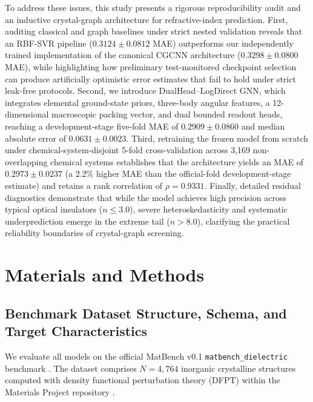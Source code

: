 \documentclass[journal,article,submit,moreauthors,pdftex]{article}
\begin{document}
To address these issues, this study presents a rigorous reproducibility audit and an inductive crystal-graph architecture for refractive-index prediction. First, auditing classical and graph baselines under strict nested validation reveals that an RBF-SVR pipeline ($0.3124 \pm 0.0812$ MAE) outperforms our independently trained implementation of the canonical CGCNN architecture ($0.3298 \pm 0.0800$ MAE), while highlighting how preliminary test-monitored checkpoint selection can produce artificially optimistic error estimates that fail to hold under strict leak-free protocols. Second, we introduce DualHead--LogDirect GNN, which integrates elemental ground-state priors, three-body angular features, a 12-dimensional macroscopic packing vector, and dual bounded readout heads, reaching a development-stage five-fold MAE of $0.2909 \pm 0.0860$ and median absolute error of $0.0631 \pm 0.0023$. Third, retraining the frozen model from scratch under chemical-system-disjoint 5-fold cross-validation across 3,169 non-overlapping chemical systems establishes that the architecture yields an MAE of $0.2973 \pm 0.0237$ (a 2.2\% higher MAE than the official-fold development-stage estimate) and retains a rank correlation of $\rho = 0.9331$. Finally, detailed residual diagnostics demonstrate that while the model achieves high precision across typical optical insulators ($n \le 3.0$), severe heteroskedasticity and systematic underprediction emerge in the extreme tail ($n > 8.0$), clarifying the practical reliability boundaries of crystal-graph screening.

\section{Materials and Methods}

\subsection{Benchmark Dataset Structure, Schema, and Target Characteristics}
We evaluate all models on the official MatBench v0.1 \texttt{matbench\_dielectric} benchmark \cite{dunn2020benchmarking}. The dataset comprises $N = 4{,}764$ inorganic crystalline structures computed with density functional perturbation theory (DFPT) within the Materials Project repository \cite{jain2013commentary, petousis2017high}.
\end{document}

